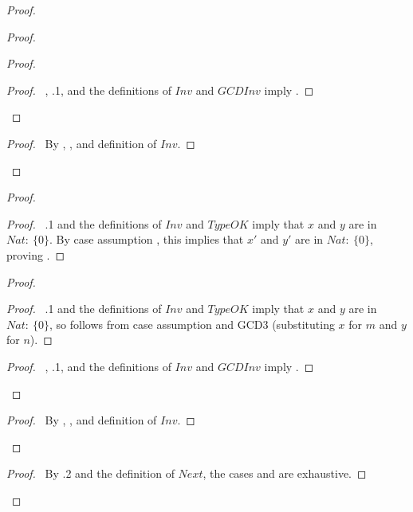 \documentclass[fleqn,leqno]{article}
\begin{document}
\begin{proof}
\begin{proof}
\begin{proof}
     \qedstep
   \vspace{.1em}
     \begin{proof}
     \pf\ , .1, and the definitions of $Inv$ 
    and $GCDInv$ imply .
     \end{proof}
  \end{proof}
\vspace{.6em}
  \qedstep
   \begin{proof}
   \pf\ By , , and definition of $Inv$.
   \end{proof}
  \end{proof}
\vspace{.9em}
\vspace{.2em}
  \begin{proof}
\vspace{.2em}
  \begin{proof}
   \pf\ .1 and the definitions of $Inv$ and $TypeOK$ 
   imply that $x$ and $y$ are in $Nat :\: \{0\}$.  By case assumption
    , this implies that $x'$ and $y'$ are in $Nat :\: \{0\}$,
   proving .
   \end{proof}
\vspace{.6em}
   \vspace{.3em}
  \begin{proof}
   \vspace{.1em}
     \begin{proof}
     \pf\ .1 and the definitions of $Inv$ and $TypeOK$ 
      imply that $x$ and $y$ are in $Nat :\: \{0\}$, so 
      follows from case assumption  and GCD3 (substituting
      $x$ for $m$ and $y$ for $n$).
     \end{proof}
   \vspace{.4em}
     \qedstep
   \vspace{.1em}
     \begin{proof}
     \pf\ , .1, and the definitions of $Inv$ 
    and $GCDInv$ imply .
     \end{proof}
  \end{proof}
\vspace{.6em}
  \qedstep
\vspace{.1em}
   \begin{proof}
   \pf\ By , , and definition of $Inv$.
   \end{proof}
  \end{proof}
\vspace{.9em}
\qedstep
\vspace{.1em}
\begin{proof}
\pf\ By .2 and the definition of $Next$, the cases
 and  are exhaustive.
\end{proof}
\end{proof}
\mbox{}\hfill \closebutton 
\end{document}
